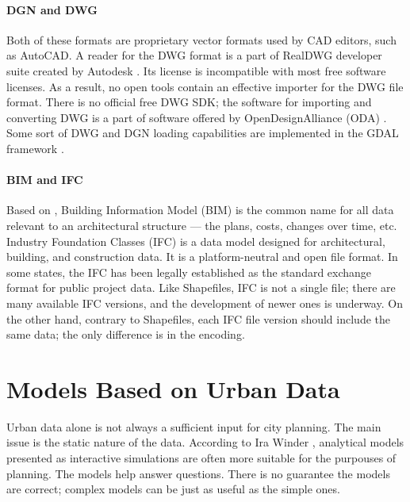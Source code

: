 \paragraph{DGN and DWG}
Both of these formats are proprietary vector formats used by CAD editors, such as AutoCAD. A reader for the DWG format is a part of RealDWG developer suite created by Autodesk \cite{autodeskRealDWG}. Its license is incompatible with most free software licenses. As a result, no open tools contain an effective importer for the DWG file format. There is no official free DWG SDK; the software for importing and converting DWG is a part of software offered by OpenDesignAlliance (ODA) \cite{alliance1998open}. Some sort of DWG and DGN loading capabilities are implemented in the GDAL framework \cite{GDALframework}.

\paragraph{BIM and IFC}
Based on \cite{TANG2017311}, Building Information Model (BIM) is the common name for all data relevant to an architectural structure --- the plans, costs, changes over time, etc. Industry Foundation Classes (IFC) is a data model designed for architectural, building, and construction data. It is a platform-neutral and open file format. In some states, the IFC has been legally established as the standard exchange format for public project data. Like Shapefiles, IFC is not a single file; there are many available IFC versions, and the development of newer ones is underway. On the other hand, contrary to Shapefiles, each IFC file version should include the same data; the only difference is in the encoding. 


\section{Models Based on Urban Data}
\label{sec:analytics}
Urban data alone is not always a sufficient input for city planning. The main issue is the static nature of the data. According to Ira Winder \cite{winderLUPA}, analytical models presented as interactive simulations are often more suitable for the purpouses of planning. The models help answer questions. There is no guarantee the models are correct; complex models can be just as useful as the simple ones. 

